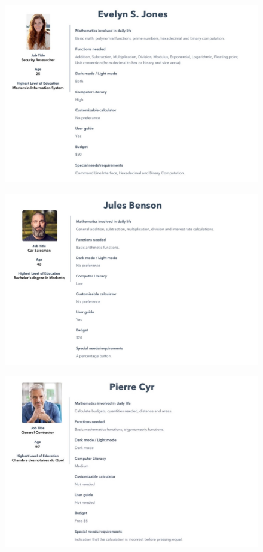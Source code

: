\documentclass[titlepage]{article}
\begin{document}
            \begin{figure}[!htb]
                \centering
                \includegraphics{images/Evelyn-S-Jones.JPG}
            \end{figure}
            \begin{figure}[!htb]
                \centering
                \includegraphics{images/Jules-Benson.JPG}
            \end{figure}
            \begin{figure}[!htb]
                \centering
                \includegraphics[scale=0.5]{images/Pierre-Cyr.JPG}
            \end{figure}
\end{document}
